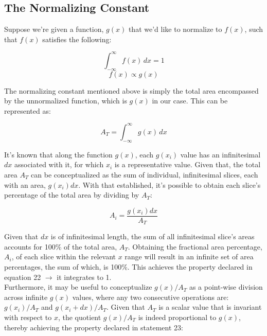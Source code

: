 \documentclass[12pt]{article}
\begin{document}
\subsection*{The Normalizing Constant}
\noindent Suppose we're given a function, $g(x)$ that we'd like to normalize to $f(x)$, such that $f(x)$ satisfies the following:

\begin{equation}
\int_{-\infty}^{\infty} f(x) \, dx = 1
\end{equation}
\begin{equation}
f(x) \propto g(x)
\end{equation}

\noindent The normalizing constant mentioned above is simply the total area encompassed by the unnormalized function, which is $g(x)$ in our case. This can be represented as:

\begin{equation}
A_T = \int_{-\infty}^{\infty} g(x) \, dx
\end{equation}

\noindent It's known that along the function $g(x)$, each $g(x_i)$ value has an infinitesimal $dx$ associated with it, for which $x_i$ is a representative value. Given that, the total area $A_T$ can be conceptualized as the sum of individual, infinitesimal slices, each with an area, $g(x_i)dx$. With that established, it's possible to obtain each slice's percentage of the total area by dividing by $A_T$:

\begin{equation}
A_i = \frac{g(x_i)dx} {A_T}
\end{equation}

\noindent Given that $dx$ is of infinitesimal length, the sum of all infinitesimal slice's areas accounts for 100\% of the total area, $A_T$. Obtaining the fractional area percentage, $A_i$, of each slice within the relevant $x$ range will result in an infinite set of area percentages, the sum of which, is 100\%. This achieves the property declared in equation 22 $\rightarrow$ it integrates to 1.\\

\noindent Furthermore, it may be useful to conceptualize $g(x) / A_T$ as a point-wise division across infinite $g(x)$ values, where any two consecutive operations are: $g(x_i) / A_T$ and $g(x_i + dx) / A_T$. Given that $A_T$ is a scalar value that is invariant with respect to $x$, the quotient $g(x) / A_T$ is indeed proportional to $g(x)$, thereby achieving the property declared in statement 23:
\end{document}
